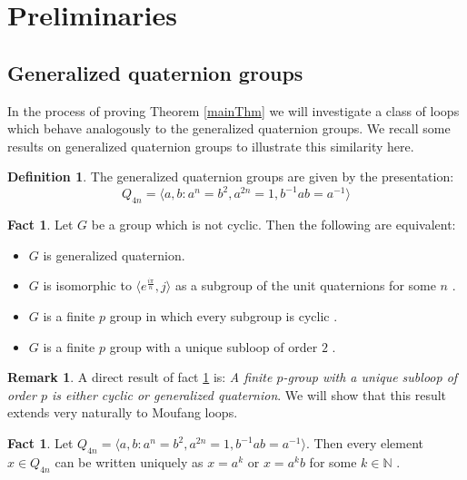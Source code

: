 \documentclass[12pt, twoside, openright]{report}
\theoremstyle{definition}
\newtheorem{fct}[thm]{Fact}
\newtheorem{dfn}[thm]{Definition}
\newtheorem*{rmk}{Remark}
\newcommand{\NNN}{\mathbb{N}}
\begin{document}

\section{Preliminaries}

\subsection{Generalized quaternion groups}

In the process of proving Theorem \ref{mainThm} we will investigate a class of loops which behave analogously
  to the generalized quaternion groups. We recall some results on generalized quaternion groups to illustrate
  this similarity here.

\begin{dfn}
  The generalized quaternion groups are given by the presentation:
  \[Q_{4n} = \langle a, b : a^n = b^2, a^{2n} = 1, b^{-1}ab = a^{-1}\rangle\]
\end{dfn}

\begin{fct}\label{fct:genQuat}
  Let $G$ be a group which is not cyclic. Then the following are equivalent:
  \begin{itemize}
    \item $G$ is generalized quaternion.
    \item $G$ is isomorphic to $\langle e^{\frac{i\pi}{n}}, j\rangle$ as a subgroup of the unit
      quaternions for some $n$ \cite{Brown}.
    \item $G$ is a finite $p$ group in which every subgroup is cyclic \cite{Cartan}.
    \item $G$ is a finite $p$ group with a unique subloop of order $2$ \cite{Brown}.
  \end{itemize}
\end{fct}

\begin{rmk}
  A direct result of fact \ref{fct:genQuat} is: \emph{A finite $p$-group with a unique subloop of order $p$ is
    either cyclic or generalized quaternion}. We will show that this result extends very naturally to Moufang loops.
\end{rmk}

\begin{fct}\label{fct:genQuat-rep}
  Let $Q_{4n} = \langle a, b : a^n = b^2, a^{2n} = 1, b^{-1}ab = a^{-1}\rangle$. Then every element $x \in Q_{4n}$
    can be written uniquely as $x = a^k$ or $x = a^k b$ for some $k\in\NNN$ \cite{genQuat}.
\end{fct}
\end{document}
